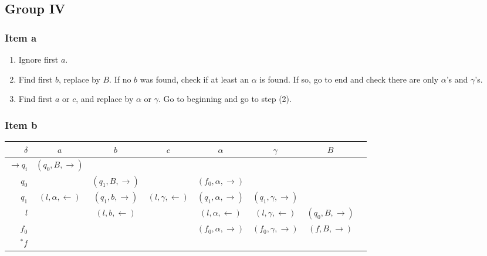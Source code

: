 {\subsection{Group IV}
\subsubsection{Item a}
\begin{enumerate}
	\item Ignore first $a$.
	\item Find first $b$, replace by $B$. If no $b$ was found, check if at least an $\alpha$ is found. If so, go to end and check there are only $\alpha$'s and $\gamma$'s. 
	\item Find first $a$ or $c$, and replace by $\alpha$ or $\gamma$. Go to beginning and go to step (2).
\end{enumerate}
\subsubsection{Item b}
\begin{center}
	\begin{tabular}{r | c c c c c c c }
		$\delta$          & $a$                     & $b$                   & $c$                     & $\alpha$                   & $\gamma$                   & $B$ \\ \hline
		$\rightarrow q_i$ & $(q_0,B,\rightarrow)$   &                       &                         &                            &                            &     \\
		$            q_0$ &                         & $(q_1,B,\rightarrow)$ &                         & $(f_0,\alpha,\rightarrow)$ &                            &     \\
		$            q_1$ & $(l,\alpha,\leftarrow)$ & $(q_1,b,\rightarrow)$ & $(l,\gamma,\leftarrow)$ & $(q_1,\alpha,\rightarrow)$ & $(q_1,\gamma,\rightarrow)$ &                     \\
		$            l  $ &                         & $(l  ,b,\leftarrow )$ &                         & $(l  ,\alpha,\leftarrow )$ & $(l  ,\gamma,\leftarrow )$ & $(q_0,B,\rightarrow)$ \\
		$            f_0$ &                         &                       &                         & $(f_0,\alpha,\rightarrow)$ & $(f_0,\gamma,\rightarrow)$ & $(f,B,\rightarrow)$ \\
		$         ^* f  $ &                         &                       &                         &                            &                            & 
	\end{tabular}
\end{center}
}

